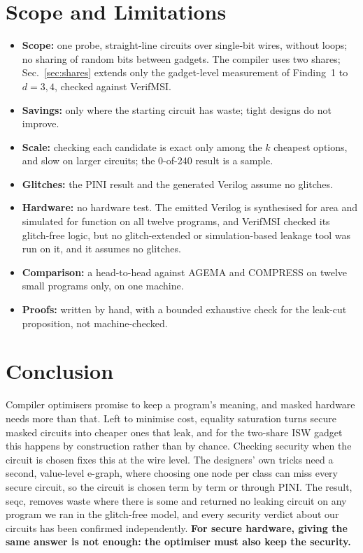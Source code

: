 \documentclass[conference]{IEEEtran}
\begin{document}
\section{Scope and Limitations}\label{sec:limits}
\begin{itemize}
\item \textbf{Scope:} one probe, straight-line circuits over single-bit wires, without loops; no sharing of random bits between gadgets. The compiler uses two shares; Sec.~\ref{sec:shares} extends only the gadget-level measurement of Finding~1 to $d=3,4$, checked against VerifMSI.
\item \textbf{Savings:} only where the starting circuit has waste; tight designs do not improve.
\item \textbf{Scale:} checking each candidate is exact only among the $k$ cheapest options, and slow on larger circuits; the 0-of-240 result is a sample.
\item \textbf{Glitches:} the PINI result and the generated Verilog assume no glitches.
\item \textbf{Hardware:} no hardware test. The emitted Verilog is synthesised for area and simulated for function on all twelve programs, and VerifMSI checked its glitch-free logic, but no glitch-extended or simulation-based leakage tool was run on it, and it assumes no glitches.
\item \textbf{Comparison:} a head-to-head against AGEMA and COMPRESS on twelve small programs only, on one machine.
\item \textbf{Proofs:} written by hand, with a bounded exhaustive check for the leak-cut proposition, not machine-checked.
\end{itemize}

\section{Conclusion}
Compiler optimisers promise to keep a program's meaning, and masked hardware needs more than that. Left to minimise cost, equality saturation turns secure masked circuits into cheaper ones that leak, and for the two-share ISW gadget this happens by construction rather than by chance. Checking security when the circuit is chosen fixes this at the wire level. The designers' own tricks need a second, value-level e-graph, where choosing one node per class can miss every secure circuit, so the circuit is chosen term by term or through PINI. The result, seqc, removes waste where there is some and returned no leaking circuit on any program we ran in the glitch-free model, and every security verdict about our circuits has been confirmed independently. \textbf{For secure hardware, giving the same answer is not enough: the optimiser must also keep the security.}
\end{document}
